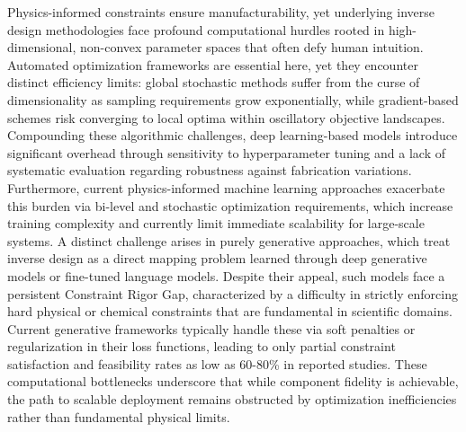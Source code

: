 Physics-informed constraints ensure manufacturability, yet underlying inverse design methodologies face profound computational hurdles rooted in high-dimensional, non-convex parameter spaces that often defy human intuition. Automated optimization frameworks are essential here, yet they encounter distinct efficiency limits: global stochastic methods suffer from the curse of dimensionality as sampling requirements grow exponentially, while gradient-based schemes risk converging to local optima within oscillatory objective landscapes. Compounding these algorithmic challenges, deep learning-based models introduce significant overhead through sensitivity to hyperparameter tuning and a lack of systematic evaluation regarding robustness against fabrication variations. Furthermore, current physics-informed machine learning approaches exacerbate this burden via bi-level and stochastic optimization requirements, which increase training complexity and currently limit immediate scalability for large-scale systems. A distinct challenge arises in purely generative approaches, which treat inverse design as a direct mapping problem learned through deep generative models or fine-tuned language models. Despite their appeal, such models face a persistent Constraint Rigor Gap, characterized by a difficulty in strictly enforcing hard physical or chemical constraints that are fundamental in scientific domains. Current generative frameworks typically handle these via soft penalties or regularization in their loss functions, leading to only partial constraint satisfaction and feasibility rates as low as 60-80\% in reported studies. These computational bottlenecks underscore that while component fidelity is achievable, the path to scalable deployment remains obstructed by optimization inefficiencies rather than fundamental physical limits. \citep{doi_10_48550_arxiv_2602_18148_e9c0a72b} \citep{doi_10_29026_oes_2022_210012_27973a69} \citep{doi_10_55041_ijsrem43509_b9a7bd5e} \citep{doi_10_48550_arxiv_2511_00070_bf8eda11}


